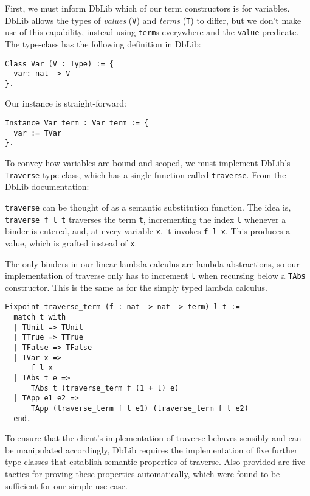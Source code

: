 \documentclass[]{unswthesis}
\let\c\texttt
\let\i\textit
\begin{document}
First, we must inform DbLib which of our term constructors is for variables. DbLib allows the types of \i{values} (\c{V}) and \i{terms} (\c{T}) to differ, but we don't make use of this capability, instead using \c{term}s everywhere and the \c{value} predicate. The type-class has the following definition in DbLib:

\begin{verbatim}
Class Var (V : Type) := {
  var: nat -> V
}.
\end{verbatim}

Our instance is straight-forward:

\begin{verbatim}
Instance Var_term : Var term := {
  var := TVar
}.
\end{verbatim}


To convey how variables are bound and scoped, we must implement DbLib's \c{Traverse} type-class, which has a single function called \c{traverse}. From the DbLib documentation:

\begin{displayquote}
\c{traverse} can be thought of as a semantic substitution function. The idea is, \c{traverse f l t} traverses the term \c{t}, incrementing the index \c{l} whenever a binder is entered, and, at every variable \c{x}, it invokes \c{f l x}. This produces a value, which is grafted instead of \c{x}.
\end{displayquote}

The only binders in our linear lambda calculus are lambda abstractions, so our implementation of traverse only has to increment \c{l} when recursing below a \c{TAbs} constructor. This is the same as for the simply typed lambda calculus.

\begin{verbatim}
Fixpoint traverse_term (f : nat -> nat -> term) l t :=
  match t with
  | TUnit => TUnit
  | TTrue => TTrue
  | TFalse => TFalse
  | TVar x =>
      f l x
  | TAbs t e =>
      TAbs t (traverse_term f (1 + l) e)
  | TApp e1 e2 =>
      TApp (traverse_term f l e1) (traverse_term f l e2)
  end.
\end{verbatim}

To ensure that the client's implementation of traverse behaves sensibly and can be manipulated accordingly, DbLib requires the implementation of five further type-classes that establish semantic properties of traverse. Also provided are five tactics for proving these properties automatically, which were found to be sufficient for our simple use-case.
\end{document}
